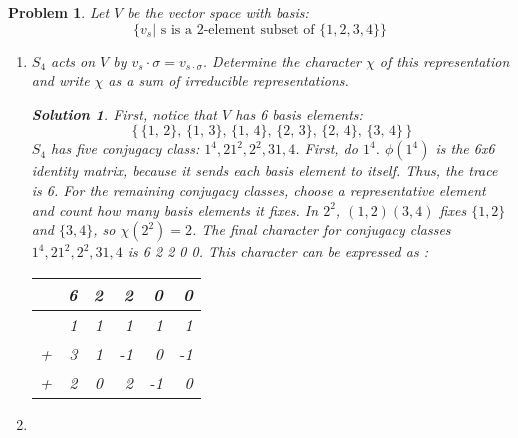 \documentclass{article}
\theoremstyle{normal}
\newtheorem{problem}{Problem}
\theoremstyle{thmit}
\newtheorem*{solution}{Solution}
\begin{document}
\begin{problem}
    Let $V$ be the vector space with basis:
    \begin{equation}
        \{ v_s \vert \text{ s is a $2$-element subset of }\{1,2,3,4\}\}
    \end{equation}
    \begin{enumerate}
        \item[(a)]
            $S_4$ acts on $V$ by $v_s\cdot\sigma = v_{s\cdot\sigma}$. Determine the character
            $\chi$ of this representation and write $\chi$ as a sum of irreducible representations.
            \begin{solution}
        
                First, notice that $V$ has 6 basis elements:
                \begin{equation}
                    \big\{\,
                        \{1,\,2\},\,
                        \{1,\,3\},\,
                        \{1,\,4\},\,
                        \{2,\,3\},\,
                        \{2,\,4\},\,
                        \{3,\,4\}\,
                    \big\}
                \end{equation}
                $S_4$ has five conjugacy class: $1^4, 2 1^2, 2^2, 31, 4$. 
                First, do $1^4$. $\phi(1^4)$ is the 6x6 identity matrix, because it sends each basis
                element to itself. Thus, the trace is 6. 
                For the remaining conjugacy classes, choose a representative element and count how many
                basis elements it fixes. In $2^2$, $(1,2)(3,4)$ fixes $\{1,2\}$ and $\{3,4\}$, so
                $\chi(2^2) = 2$.  The final character for conjugacy classes $1^4, 2 1^2, 2^2, 31, 4$ is
                6 2 2 0 0. This character can be expressed as :
                \begin{table}[H]
                    \centering
                    \begin{tabular}{rrrrrr}
                          & 6 & 2 & 2 & 0 & 0\\ 
                        \hline 
                          & 1 & 1 & 1 & 1 & 1\\
                        + & 3 & 1 & -1 & 0 & -1 \\
                        + & 2 & 0 & 2 & -1 & 0
                    \end{tabular}
                \end{table}
            \end{solution}
        \item[(b)]

\end{enumerate}
\end{problem}
\end{document}
